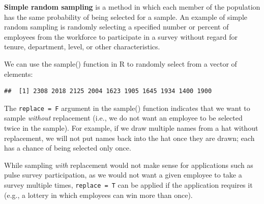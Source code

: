 \documentclass[
]{book}
\newenvironment{Shaded}{\begin{snugshade}}{\end{snugshade}}
\newcommand{\AttributeTok}[1]{\textcolor[rgb]{0.77,0.63,0.00}{#1}}
\newcommand{\CommentTok}[1]{\textcolor[rgb]{0.56,0.35,0.01}{\textit{#1}}}
\newcommand{\DecValTok}[1]{\textcolor[rgb]{0.00,0.00,0.81}{#1}}
\newcommand{\FunctionTok}[1]{\textcolor[rgb]{0.00,0.00,0.00}{#1}}
\newcommand{\NormalTok}[1]{#1}
\newcommand{\OtherTok}[1]{\textcolor[rgb]{0.56,0.35,0.01}{#1}}
\newcommand{\SpecialCharTok}[1]{\textcolor[rgb]{0.00,0.00,0.00}{#1}}
\newcommand{\StringTok}[1]{\textcolor[rgb]{0.31,0.60,0.02}{#1}}
\begin{document}
\textbf{Simple random sampling} is a method in which each member of the population has the same probability of being selected for a sample. An example of simple random sampling is randomly selecting a specified number or percent of employees from the workforce to participate in a survey without regard for tenure, department, level, or other characteristics.

We can use the sample() function in R to randomly select from a vector of elements:

\begin{Shaded}
\end{Shaded}

\begin{verbatim}
##  [1] 2308 2018 2125 2004 1623 1905 1645 1934 1400 1900
\end{verbatim}

The \texttt{replace\ =\ F} argument in the sample() function indicates that we want to sample \emph{without} replacement (i.e., we do not want an employee to be selected twice in the sample). For example, if we draw multiple names from a hat without replacement, we will not put names back into the hat once they are drawn; each has a chance of being selected only once.

While sampling \emph{with} replacement would not make sense for applications such as pulse survey participation, as we would not want a given employee to take a survey multiple times, \texttt{replace\ =\ T} can be applied if the application requires it (e.g., a lottery in which employees can win more than once).
\end{document}
